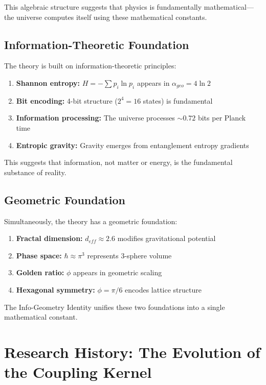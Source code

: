 \documentclass[11pt, a4paper]{article}
\begin{document}
This algebraic structure suggests that physics is fundamentally mathematical—the universe computes itself using these mathematical constants.

\subsection{Information-Theoretic Foundation}

The theory is built on information-theoretic principles:
\begin{enumerate}
    \item \textbf{Shannon entropy:} $H = -\sum p_i \ln p_i$ appears in $\alpha_{geo} = 4\ln 2$
    \item \textbf{Bit encoding:} 4-bit structure ($2^4 = 16$ states) is fundamental
    \item \textbf{Information processing:} The universe processes $\sim 0.72$ bits per Planck time
    \item \textbf{Entropic gravity:} Gravity emerges from entanglement entropy gradients
\end{enumerate}

This suggests that information, not matter or energy, is the fundamental substance of reality.

\subsection{Geometric Foundation}

Simultaneously, the theory has a geometric foundation:
\begin{enumerate}
    \item \textbf{Fractal dimension:} $d_{eff} \approx 2.6$ modifies gravitational potential
    \item \textbf{Phase space:} $\hbar \approx \pi^3$ represents 3-sphere volume
    \item \textbf{Golden ratio:} $\phi$ appears in geometric scaling
    \item \textbf{Hexagonal symmetry:} $\phi = \pi/6$ encodes lattice structure
\end{enumerate}

The Info-Geometry Identity unifies these two foundations into a single mathematical constant.

\section{Research History: The Evolution of the Coupling Kernel}
\end{document}

